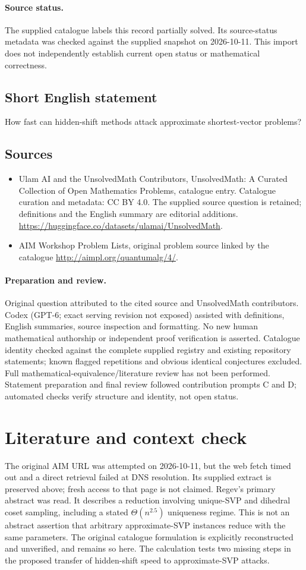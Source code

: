 \documentclass[11pt]{article}
\begin{document}
\paragraph{Source status.}
The supplied catalogue labels this record partially solved. Its source-status metadata was checked against the supplied snapshot on 2026-10-11. This import does not independently establish current open status or mathematical correctness.
\subsection{Short English statement}
How fast can hidden-shift methods attack approximate shortest-vector problems?
\subsection{Sources}
\begin{itemize}
\item[S1] Ulam AI and the UnsolvedMath Contributors, UnsolvedMath: A Curated Collection of Open Mathematics Problems, catalogue entry. Catalogue curation and metadata: CC BY 4.0. The supplied source question is retained; definitions and the English summary are editorial additions.
\url{https://huggingface.co/datasets/ulamai/UnsolvedMath}.
\item[S2] AIM Workshop Problem Lists, original problem source linked by the catalogue
\url{http://aimpl.org/quantumalg/4/}.
\end{itemize}
\paragraph{Preparation and review.}
Original question attributed to the cited source and UnsolvedMath contributors. Codex (GPT-6; exact serving revision not exposed) assisted with definitions, English summaries, source inspection and formatting. No new human mathematical authorship or independent proof verification is asserted. Catalogue identity checked against the complete supplied registry and existing repository statements; known flagged repetitions and obvious identical conjectures excluded. Full mathematical-equivalence/literature review has not been performed. Statement preparation and final review followed contribution prompts C and D; automated checks verify structure and identity, not open status.
\label{end:statement}

\section{Literature and context check}
The original AIM URL was attempted on 2026-10-11, but the web fetch timed out and a direct retrieval failed at DNS resolution. Its supplied extract is preserved above; fresh access to that page is not claimed. Regev's primary abstract was read. It describes a reduction involving unique-SVP and dihedral coset sampling, including a stated $\Theta(n^{2.5})$ uniqueness regime. This is not an abstract assertion that arbitrary approximate-SVP instances reduce with the same parameters. The original catalogue formulation is explicitly reconstructed and unverified, and remains so here. The calculation tests two missing steps in the proposed transfer of hidden-shift speed to approximate-SVP attacks.
\end{document}
